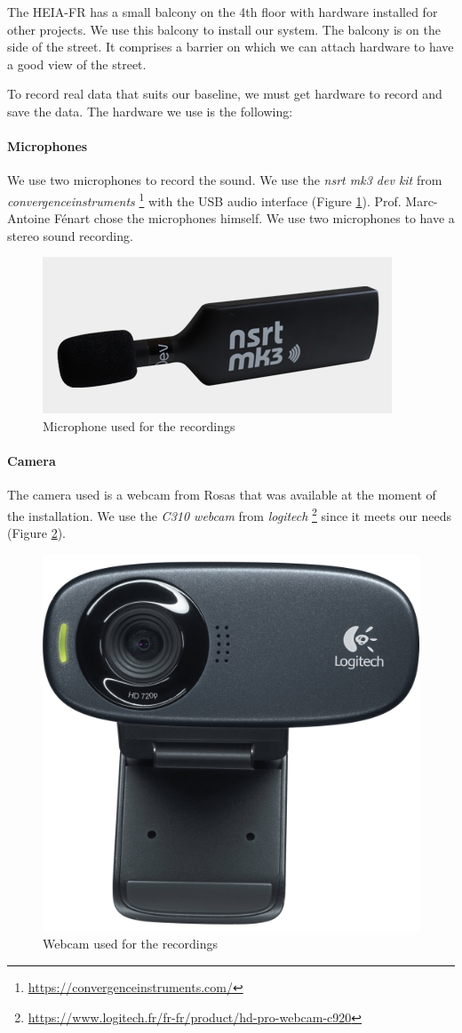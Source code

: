 The HEIA-FR has a small balcony on the 4th floor with hardware installed for other projects. We use this balcony to install our system. The balcony is on the side of the street. It comprises a barrier on which we can attach hardware to have a good view of the street. 

To record real data that suits our baseline, we must get hardware to record and save the data. The hardware we use is the following:

\paragraph{Microphones}
We use two microphones to record the sound. We use the \textit{nsrt mk3 dev kit} from \textit{convergenceinstruments} \footnote{\url{https://convergenceinstruments.com/}} with the USB audio interface (Figure \ref{fig:nsrt_mk3_mic}). Prof. Marc-Antoine Fénart chose the microphones himself. We use two microphones to have a stereo sound recording.

\begin{figure}[H]
    \centering
    \includegraphics[width=.5\textwidth]{images/nsrt_mk3_mic.png}
    \caption{Microphone used for the recordings}
    \label{fig:nsrt_mk3_mic}
\end{figure}

\paragraph{Camera}
The camera used is a webcam from Rosas that was available at the moment of the installation. We use the \textit{C310 webcam} from \textit{logitech} \footnote{\url{https://www.logitech.fr/fr-fr/product/hd-pro-webcam-c920}} since it meets our needs (Figure \ref{fig:c310_webcam}). 

\begin{figure}[H]
    \centering
    \includegraphics[width=.5\textwidth]{images/c310_webcam.png}
    \caption{Webcam used for the recordings}
    \label{fig:c310_webcam}
\end{figure}

